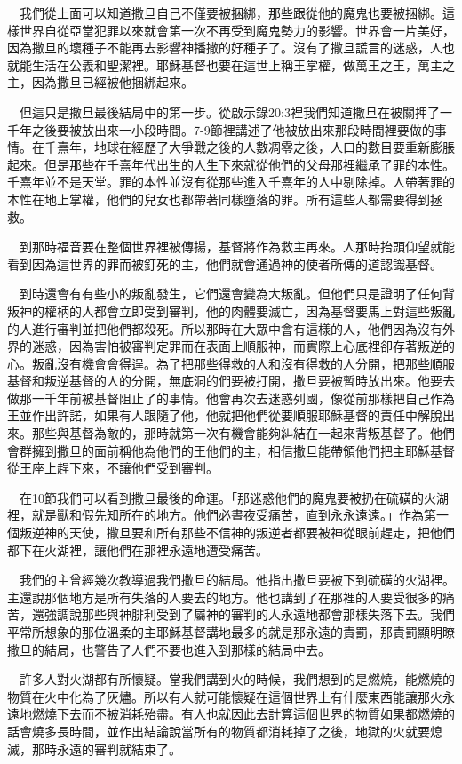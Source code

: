 \documentclass{book}
\begin{document}
　我們從上面可以知道撒旦自己不僅要被捆綁，那些跟從他的魔鬼也要被捆綁。這樣世界自從亞當犯罪以來就會第一次不再受到魔鬼勢力的影響。世界會一片美好，因為撒旦的壞種子不能再去影響神播撒的好種子了。沒有了撒旦謊言的迷惑，人也就能生活在公義和聖潔裡。耶穌基督也要在這世上稱王掌權，做萬王之王，萬主之主，因為撒旦已經被他捆綁起來。

　但這只是撒旦最後結局中的第一步。從啟示錄20:3裡我們知道撒旦在被關押了一千年之後要被放出來一小段時間。7-9節裡講述了他被放出來那段時間裡要做的事情。在千熹年，地球在經歷了大爭戰之後的人數凋零之後，人口的數目要重新膨脹起來。但是那些在千熹年代出生的人生下來就從他們的父母那裡繼承了罪的本性。千熹年並不是天堂。罪的本性並沒有從那些進入千熹年的人中剔除掉。人帶著罪的本性在地上掌權，他們的兒女也都帶著同樣墮落的罪。所有這些人都需要得到拯救。

　到那時福音要在整個世界裡被傳揚，基督將作為救主再來。人那時抬頭仰望就能看到因為這世界的罪而被釘死的主，他們就會通過神的使者所傳的道認識基督。

　到時還會有有些小的叛亂發生，它們還會變為大叛亂。但他們只是證明了任何背叛神的權柄的人都會立即受到審判，他的肉體要滅亡，因為基督要馬上對這些叛亂的人進行審判並把他們都殺死。所以那時在大眾中會有這樣的人，他們因為沒有外界的迷惑，因為害怕被審判定罪而在表面上順服神，而實際上心底裡卻存著叛逆的心。叛亂沒有機會會得逞。為了把那些得救的人和沒有得救的人分開，把那些順服基督和叛逆基督的人的分開，無底洞的們要被打開，撒旦要被暫時放出來。他要去做那一千年前被基督阻止了的事情。他會再次去迷惑列國，像從前那樣把自己作為王並作出許諾，如果有人跟隨了他，他就把他們從要順服耶穌基督的責任中解脫出來。那些與基督為敵的，那時就第一次有機會能夠糾結在一起來背叛基督了。他們會群擁到撒旦的面前稱他為他們的王他們的主，相信撒旦能帶領他們把主耶穌基督從王座上趕下來，不讓他們受到審判。

　在10節我們可以看到撒旦最後的命運。「那迷惑他們的魔鬼要被扔在硫磺的火湖裡，就是獸和假先知所在的地方。他們必晝夜受痛苦，直到永永遠遠。」作為第一個叛逆神的天使，撒旦要和所有那些不信神的叛逆者都要被神從眼前趕走，把他們都下在火湖裡，讓他們在那裡永遠地遭受痛苦。

　我們的主曾經幾次教導過我們撒旦的結局。他指出撒旦要被下到硫磺的火湖裡。主還說那個地方是所有失落的人要去的地方。他也講到了在那裡的人要受很多的痛苦，還強調說那些與神腓利受到了屬神的審判的人永遠地都會那樣失落下去。我們平常所想象的那位溫柔的主耶穌基督講地最多的就是那永遠的責罰，那責罰顯明瞭撒旦的結局，也警告了人們不要也進入到那樣的結局中去。

　許多人對火湖都有所懷疑。當我們講到火的時候，我們想到的是燃燒，能燃燒的物質在火中化為了灰燼。所以有人就可能懷疑在這個世界上有什麼東西能讓那火永遠地燃燒下去而不被消耗殆盡。有人也就因此去計算這個世界的物質如果都燃燒的話會燒多長時間，並作出結論說當所有的物質都消耗掉了之後，地獄的火就要熄滅，那時永遠的審判就結束了。
\end{document}
